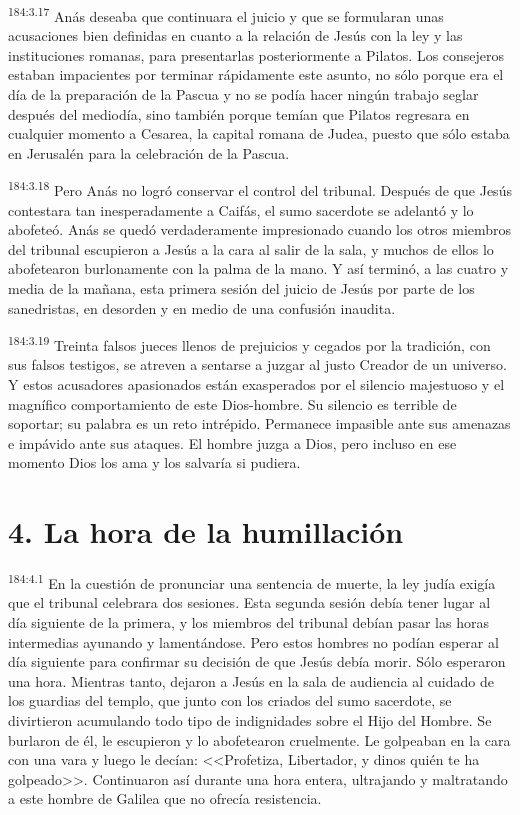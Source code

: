 \par 
\textsuperscript{184:3.17} Anás deseaba que continuara el juicio y que se formularan unas acusaciones bien definidas en cuanto a la relación de Jesús con la ley y las instituciones romanas, para presentarlas posteriormente a Pilatos. Los consejeros estaban impacientes por terminar rápidamente este asunto, no sólo porque era el día de la preparación de la Pascua y no se podía hacer ningún trabajo seglar después del mediodía, sino también porque temían que Pilatos regresara en cualquier momento a Cesarea, la capital romana de Judea, puesto que sólo estaba en Jerusalén para la celebración de la Pascua.

\par 
\textsuperscript{184:3.18} Pero Anás no logró conservar el control del tribunal. Después de que Jesús contestara tan inesperadamente a Caifás, el sumo sacerdote se adelantó y lo abofeteó. Anás se quedó verdaderamente impresionado cuando los otros miembros del tribunal escupieron a Jesús a la cara al salir de la sala, y muchos de ellos lo abofetearon burlonamente con la palma de la mano. Y así terminó, a las cuatro y media de la mañana, esta primera sesión del juicio de Jesús por parte de los sanedristas, en desorden y en medio de una confusión inaudita.

\par 
\textsuperscript{184:3.19} Treinta falsos jueces llenos de prejuicios y cegados por la tradición, con sus falsos testigos, se atreven a sentarse a juzgar al justo Creador de un universo. Y estos acusadores apasionados están exasperados por el silencio majestuoso y el magnífico comportamiento de este Dios-hombre. Su silencio es terrible de soportar; su palabra es un reto intrépido. Permanece impasible ante sus amenazas e impávido ante sus ataques. El hombre juzga a Dios, pero incluso en ese momento Dios los ama y los salvaría si pudiera.

\section*{4. La hora de la humillación}
\par 
\textsuperscript{184:4.1} En la cuestión de pronunciar una sentencia de muerte, la ley judía exigía que el tribunal celebrara dos sesiones. Esta segunda sesión debía tener lugar al día siguiente de la primera, y los miembros del tribunal debían pasar las horas intermedias ayunando y lamentándose. Pero estos hombres no podían esperar al día siguiente para confirmar su decisión de que Jesús debía morir. Sólo esperaron una hora. Mientras tanto, dejaron a Jesús en la sala de audiencia al cuidado de los guardias del templo, que junto con los criados del sumo sacerdote, se divirtieron acumulando todo tipo de indignidades sobre el Hijo del Hombre. Se burlaron de él, le escupieron y lo abofetearon cruelmente. Le golpeaban en la cara con una vara y luego le decían: <<Profetiza, Libertador, y dinos quién te ha golpeado>>. Continuaron así durante una hora entera, ultrajando y maltratando a este hombre de Galilea que no ofrecía resistencia.

